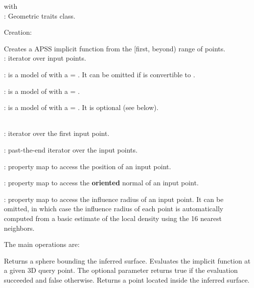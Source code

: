 with  \\
: Geometric traits class.


Creation:


{
Creates a APSS implicit function from the [first, beyond) range of points.
  \\
: iterator over input points.

: is a model of  with a  = . It can be omitted if   is convertible to .

: is a model of  with a  = .

: is a model of  with a  = . It is optional (see below).

  \\
: iterator over the first input point.

: past-the-end iterator over the input points.

: property map to access the position of an input point.

: property map to access the {\bf oriented} normal of an input point.

: property map to access the influence radius of an input point. It can be omitted, in which case the influence radius of each point is automatically computed from a basic estimate of the local density using the 16 nearest neighbors.
}


The main operations are:

{
Returns a sphere bounding the inferred surface.
}
\ccGlue
{}
{
Evaluates the implicit function at a given 3D query point. The optional parameter  returns true if the evaluation succeeded and false otherwise.
}
\ccGlue
{}
{
Returns a point located inside the inferred surface.
}


